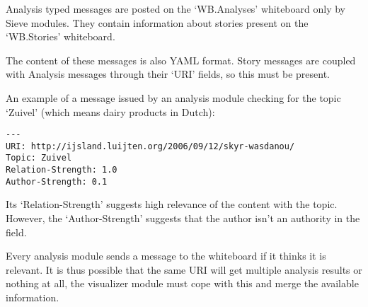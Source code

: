 Analysis typed messages are posted on the `WB.Analyses' whiteboard only by
Sieve modules. They contain information about stories present on the
`WB.Stories' whiteboard.

The content of these messages is also YAML format. Story messages are coupled
with Analysis messages through their `URI' fields, so this must be present.

An example of a message issued by an analysis module checking for the topic
`Zuivel' (which means dairy products in Dutch):

\begin{verbatim}
---
URI: http://ijsland.luijten.org/2006/09/12/skyr-wasdanou/
Topic: Zuivel
Relation-Strength: 1.0
Author-Strength: 0.1
\end{verbatim}

Its `Relation-Strength' suggests high relevance of the content with the topic.
However, the `Author-Strength' suggests that the author isn't an authority in
the field.

Every analysis module sends a message to the whiteboard if it thinks it is
relevant. It is thus possible that the same URI will get multiple analysis
results or nothing at all, the visualizer module must cope with this and merge
the available information.

